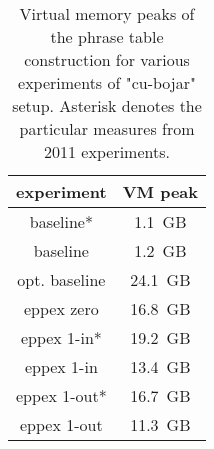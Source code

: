 \begin{table}[ht]
\centering
\begin{tabular}{ | c | c | }
\hline
experiment & VM peak \\
\hline
\hline
baseline*     & 1.1~GB \\
baseline      & 1.2~GB \\
opt. baseline & 24.1~GB \\
eppex zero    & 16.8~GB \\
\hline
eppex 1-in*   & 19.2~GB \\
eppex 1-in    & 13.4~GB \\
\hline
eppex 1-out*  & 16.7~GB \\
eppex 1-out   & 11.3~GB \\
\hline
\end{tabular}
\caption{\label{cu-bojar-vm-peak-benchmarks}Virtual memory peaks of
the phrase table construction for various experiments of "cu-bojar" setup.
Asterisk denotes the particular measures from 2011 experiments.}
\end{table}
